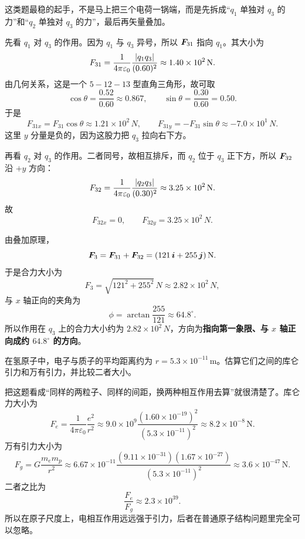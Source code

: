 \documentclass[lang=cn,11pt]{elegantbook}
\begin{document}
\begin{solution}
这类题最稳的起手，不是马上把三个电荷一锅端，而是先拆成“\(q_1\) 单独对 \(q_3\) 的力”和“\(q_2\) 单独对 \(q_3\) 的力”，最后再矢量叠加。

先看 \(q_1\) 对 \(q_3\) 的作用。因为 \(q_1\) 与 \(q_3\) 异号，所以 \(\vb*{F}_{31}\) 指向 \(q_1\)。其大小为
\[
F_{31}
=\frac{1}{4\pi\varepsilon_0}\frac{\abs{q_1q_3}}{(0.60)^2}
\approx 1.40\times 10^2\,\si{N}.
\]
由几何关系，这是一个 \(5\!-\!12\!-\!13\) 型直角三角形，故可取
\[
\cos\theta=\frac{0.52}{0.60}\approx 0.867,\qquad
\sin\theta=\frac{0.30}{0.60}=0.50.
\]
于是
\[
F_{31x}=F_{31}\cos\theta\approx 1.21\times 10^2\,\si{N},
\qquad
F_{31y}=-F_{31}\sin\theta\approx -7.0\times 10^1\,\si{N}.
\]
这里 \(y\) 分量是负的，因为这股力把 \(q_3\) 拉向右下方。

再看 \(q_2\) 对 \(q_3\) 的作用。二者同号，故相互排斥，而 \(q_2\) 位于 \(q_3\) 正下方，所以 \(\vb*{F}_{32}\) 沿 \(+y\) 方向：
\[
F_{32}
=\frac{1}{4\pi\varepsilon_0}\frac{\abs{q_2q_3}}{(0.30)^2}
\approx 3.25\times 10^2\,\si{N}.
\]
故
\[
F_{32x}=0,\qquad F_{32y}=3.25\times 10^2\,\si{N}.
\]

由叠加原理，
\[
\vb*{F}_3
=\vb*{F}_{31}+\vb*{F}_{32}
=(121\,\vb*{i}+255\,\vb*{j})\,\si{N}.
\]
于是合力大小为
\[
F_3=\sqrt{121^2+255^2}\,\si{N}\approx 2.82\times 10^2\,\si{N},
\]
与 \(x\) 轴正向的夹角为
\[
\phi=\arctan\frac{255}{121}\approx 64.8^\circ.
\]
所以作用在 \(q_3\) 上的合力大小约为 \(2.82\times 10^2\,\si{N}\)，方向为\textbf{指向第一象限、与 \(x\) 轴正向成约 \(64.8^\circ\) 的方向}。
\end{solution}

\begin{example}[氢原子中库仑力与万有引力的量级比较]
在氢原子中，电子与质子的平均距离约为 \(r=5.3\times 10^{-11}\,\mathrm{m}\)。估算它们之间的库仑引力和万有引力，并比较二者大小。
\end{example}

\begin{solution}
把这题看成“同样的两粒子、同样的间距，换两种相互作用去算”就很清楚了。库仑力大小为
\[
F_e=\frac{1}{4\pi\varepsilon_0}\frac{e^2}{r^2}
\approx 9.0\times 10^9
\frac{(1.60\times 10^{-19})^2}{(5.3\times 10^{-11})^2}
\approx 8.2\times 10^{-8}\,\mathrm{N}.
\]
万有引力大小为
\[
F_g=G\frac{m_em_p}{r^2}
\approx 6.67\times 10^{-11}
\frac{(9.11\times 10^{-31})(1.67\times 10^{-27})}{(5.3\times 10^{-11})^2}
\approx 3.6\times 10^{-47}\,\mathrm{N}.
\]
二者之比为
\[
\frac{F_e}{F_g}\approx 2.3\times 10^{39}.
\]
所以在原子尺度上，电相互作用远远强于引力，后者在普通原子结构问题里完全可以忽略。
\end{solution}
\end{document}
